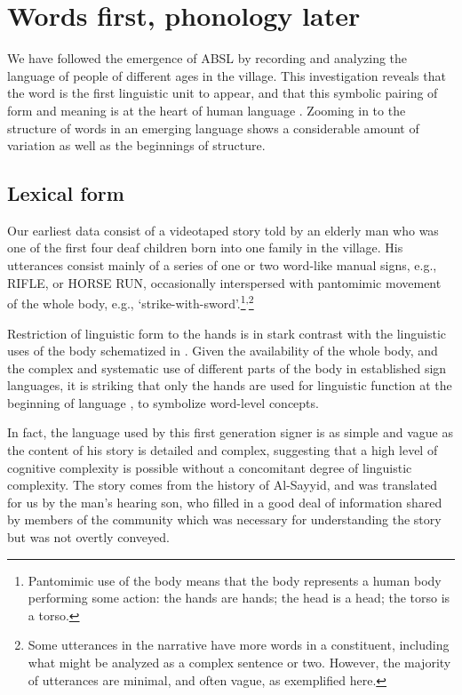 \documentclass[output=paper]{langsci/langscibook}
\begin{document}
\section{Words first, phonology later}

We have followed the emergence of ABSL by recording and analyzing the language of people of different ages in the village.  This investigation reveals that the word is the first linguistic unit to appear, and that this symbolic pairing of form and meaning is at the heart of human language \citep{Sandler2013}.  Zooming in to the structure of words in an emerging language shows a considerable amount of variation as well as the beginnings of structure.  

\subsection{Lexical form}

Our earliest data consist of a videotaped story told by an elderly man who was one of the first four deaf children born into one family in the village.  His utterances consist mainly of a series of one or two word-like manual signs, e.g., RIFLE, or HORSE RUN, occasionally interspersed with pantomimic movement of the whole body, e.g., ‘strike-with-sword’.\footnote{Pantomimic use of the body means that the body represents a human body performing some action: the hands are hands; the head is a head; the torso is a torso.  }\textsuperscript{,}\footnote{Some utterances in the narrative have more words in a constituent, including what might be analyzed as a complex sentence or two.  However, the majority of utterances are minimal, and often vague, as exemplified here.} 

 Restriction of linguistic form to the hands is in stark contrast with the linguistic uses of the body schematized in .  Given the availability of the whole body, and the complex and systematic use of different parts of the body in established sign languages, it is striking that only the hands are used for linguistic function at the beginning of language \citep{Sandler2012a}, to symbolize word-level concepts.  

 In fact, the language used by this first generation signer is as simple and vague as the content of his story is detailed and complex, suggesting that a high level of cognitive complexity is possible without a concomitant degree of linguistic complexity.  The story comes from the history of Al-Sayyid, and was translated for us by the man’s hearing son, who filled in a good deal of information shared by members of the community which was necessary for understanding the story but was not overtly conveyed.   
\end{document}
